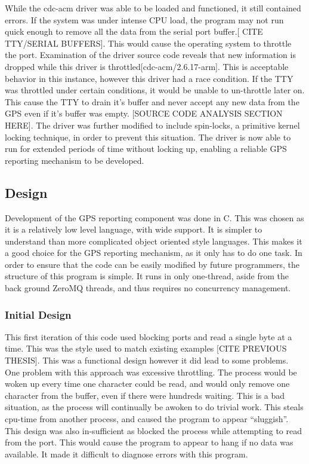 While the cdc-acm driver was able to be loaded and functioned, it still contained errors. If the system was under intense CPU load, the program may not run quick enough to remove all the data from the serial port buffer.[ CITE TTY/SERIAL BUFFERS]. This would cause the operating system to throttle the port. Examination of the driver source code reveals that new information is dropped while this driver is throttled[cdc-acm/2.6.17-arm]. This is acceptable behavior in this instance, however this driver had a race condition. If the TTY was throttled under certain conditions, it would be unable to un-throttle later on. This cause the TTY to drain it’s buffer and never accept any new data from the GPS even if it’s buffer was empty. [SOURCE CODE ANALYSIS SECTION HERE]. The driver was further modified to include spin-locks, a primitive kernel locking technique, in order to prevent this situation. The driver is now able to run for extended periods of time without locking up, enabling a reliable GPS reporting mechanism to be developed. 

\subsection {Design}

Development of the GPS reporting component was done in C. This was chosen as it is a relatively low level language, with wide support. It is simpler to understand than more complicated object oriented style languages. This makes it a good choice for the GPS reporting mechanism, as it only has to do one task. In order to ensure that the code can be easily modified by future programmers, the structure of this program is simple. It runs in only one-thread, aside from the back ground ZeroMQ threads, and thus requires no concurrency management.

\subsubsection{Initial Design}

This first iteration of this code used blocking ports and read a single byte at a time. This was the style used to match existing examples [CITE PREVIOUS THESIS]. This was a functional design however it did lead to some problems. One problem with this approach was excessive throttling. The process would be woken up every time one character could be read, and would only remove one character from the buffer, even if there were hundreds waiting. This is a bad situation, as the process will continually be awoken to do trivial work. This steals cpu-time from another process, and caused the program to appear “sluggish”. This design was also in-sufficient as blocked the process while attempting to read from the port. This would cause the program to appear to hang if no data was available. It made it difficult to diagnose errors with this program.


